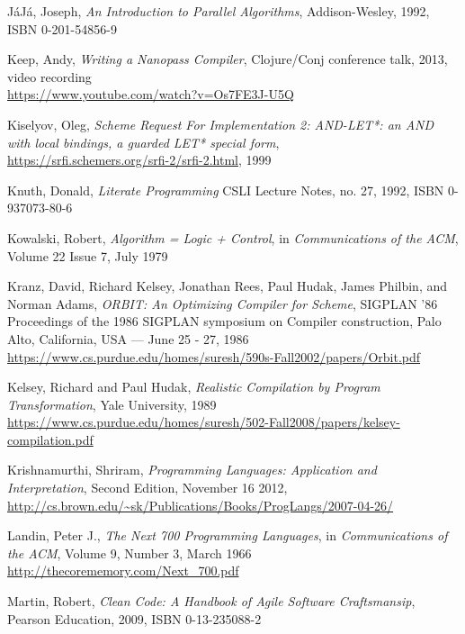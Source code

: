 \begin{thebibliography}{90}
  JáJá, Joseph, \emph{An Introduction to Parallel Algorithms},
  Addison-Wesley, 1992,
  ISBN 0-201-54856-9

  Keep, Andy, \emph{Writing a Nanopass Compiler}, Clojure/Conj
  conference talk, 2013, video recording \\
  \url{https://www.youtube.com/watch?v=Os7FE3J-U5Q}

  Kiselyov, Oleg,
  \emph{Scheme Request For Implementation 2: AND-LET*: an AND with
    local bindings, a guarded LET* special form}, \\
  \url{https://srfi.schemers.org/srfi-2/srfi-2.html}, 1999
  
  Knuth, Donald,
  \emph{Literate Programming}
  CSLI Lecture Notes, no. 27, 1992,
  ISBN 0-937073-80-6

  Kowalski, Robert, \emph{Algorithm = Logic + Control},
  in \emph{Communications of the ACM}, Volume 22 Issue 7, July 1979
  
  Kranz, David, Richard Kelsey, Jonathan Rees, Paul Hudak, James Philbin,
  and Norman Adams, \emph{ORBIT: An Optimizing Compiler for Scheme},
  SIGPLAN '86 Proceedings of the 1986 SIGPLAN symposium on Compiler construction,
  Palo Alto, California, USA — June 25 - 27, 1986 \\
  \url{https://www.cs.purdue.edu/homes/suresh/590s-Fall2002/papers/Orbit.pdf}

  Kelsey, Richard and Paul Hudak, \emph{Realistic Compilation by Program
    Transformation}, Yale University, 1989 \\
  \url{https://www.cs.purdue.edu/homes/suresh/502-Fall2008/papers/kelsey-compilation.pdf}
  
  Krishnamurthi, Shriram,
  \emph{Programming Languages: Application and Interpretation},
  Second Edition, November 16 2012, \\
  \url{http://cs.brown.edu/~sk/Publications/Books/ProgLangs/2007-04-26/}

  Landin, Peter J., \emph{The Next 700 Programming Languages},
  in \emph{Communications of the ACM}, Volume 9, Number 3, March 1966 \\
  \url{http://thecorememory.com/Next_700.pdf}
  
  Martin, Robert,
  \emph{Clean Code: A Handbook of Agile Software Craftsmansip},
  Pearson Education, 2009,
  ISBN 0-13-235088-2


\end{thebibliography}
